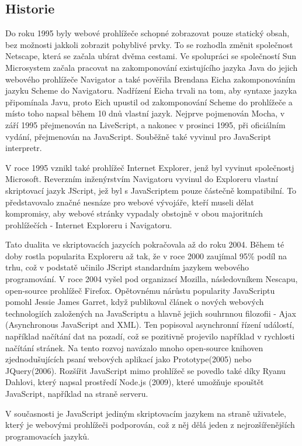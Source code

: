 \documentclass[main.tex]{subfiles}
\begin{document}
\subsection{Historie}
Do roku 1995 byly webové prohlížeče schopné zobrazovat pouze statický obsah, bez možnosti jakkoli zobrazit pohyblivé prvky. To se rozhodla změnit společnost Netscape, která se začala ubírat dvěma cestami. Ve spolupráci se společností Sun Microsystem začala pracovat na zakomponování existujícího jazyka Java do jejich webového prohlížeče Navigator a také pověřila Brendana Eicha zakomponováním jazyku Scheme do Navigatoru. Nadřízení Eicha trvali na tom, aby syntaxe jazyka připomínala Javu, proto Eich upustil od zakomponování Scheme do prohlížeče a místo toho napsal během 10 dnů vlastní jazyk. Nejprve pojmenován Mocha, v září 1995 přejmenován na LiveScript, a nakonec v prosinci 1995, při oficiálním vydání, přejmenován na JavaScript. Souběžně také vyvinul pro JavaScript interpretr.

V roce 1995 vznikl také prohlížeč Internet Explorer, jenž byl vyvinut společnostj Microsoft. Reverzním inženýrstvím Navigatoru vyvinul do Exploreru vlastní skriptovací jazyk JScript, jež byl s JavaScriptem pouze částečně kompatibilní. To představovalo značné nesnáze pro webové vývojáře, kteří museli dělat kompromisy, aby webové stránky vypadaly obstojně v obou majoritních prohlížečích - Internet Exploreru i Navigatoru. 

Tato dualita ve skriptovacích jazycích pokračovala až do roku 2004. Během té doby rostla popularita Exploreru až tak, že v roce 2000 zaujímal 95\% podíl na trhu, což v podstatě učinilo JScript standardním jazykem webového programování. V roce 2004 vyšel pod organizací Mozilla, následovníkem Nescapu, open-source prohlížeč Firefox. 
Opětovnému nárůstu popularity JavaScriptu pomohl Jessie James Garret, když publikoval článek o nových webových technologiích založených na JavaScriptu a hlavně jejich souhrnnou filozofii - Ajax (Asynchronous JavaScript and XML). Ten popisoval asynchronní řízení událostí, například načítání dat na pozadí, což se pozitivně projevilo například v rychlosti načítání stránek. Na tento rozvoj navázalo mnoho open-source knihoven zjednodušujících psaní webových aplikací jako Prototype(2005) nebo JQuery(2006).
Rozšířit JavaScript mimo prohlížeč se povedlo také díky Ryanu Dahlovi, který napsal prostředí Node.js (2009), které umožňuje spouštět JavaScript, například na straně serveru.

V současnosti je JavaScript jediným skriptovacím jazykem na straně uživatele, který je webovými prohlížeči podporován, což z něj dělá jeden z nejrozšířenějších programovacích jazyků.

\end{document}

